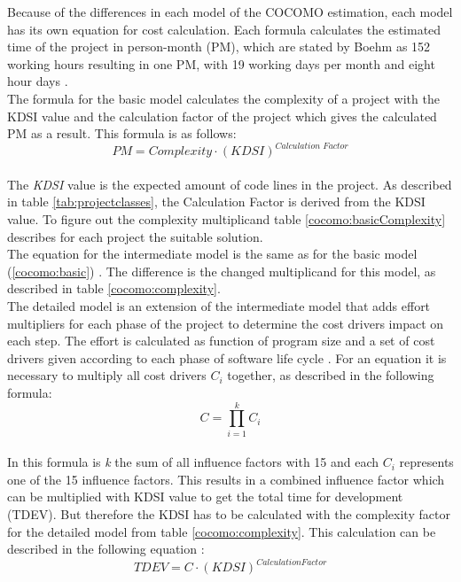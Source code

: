Because of the differences in each model of the COCOMO estimation, each model has its own equation for cost calculation. Each formula calculates the estimated time of the project in person-month (PM), which are stated by Boehm as 152 working hours resulting in one PM, with 19 working days per month and eight hour days \cite{boehm}. \\
The formula for the basic model calculates the complexity of a project with the KDSI value and the calculation factor of the project which gives the calculated PM as a result. This formula is as follows:\\
\begin{equation}
\textit{PM} = \textit{Complexity} \cdot (\textit{KDSI})^{\textit{Calculation Factor}} \label{cocomo:basic}
\end{equation}\\
The \textit{KDSI} value is the expected amount of code lines in the project. As described in table \ref{tab:projectclasses}, the Calculation Factor is derived from the KDSI value. To figure out the complexity multiplicand table \ref{cocomo:basicComplexity} describes for each project the suitable solution.\\
The equation for the intermediate model is the same as for the basic model (\ref{cocomo:basic}) \cite{boehm}. The difference is the changed multiplicand for this model, as described in table \ref{cocomo:complexity}.\\
The detailed model is an extension of the intermediate model that adds effort multipliers for each phase of the project to determine the cost drivers impact on each step. The effort is calculated as function of program size and a set of cost drivers given according to each phase of software life cycle \cite{boehm}. For an equation it is necessary to multiply all cost drivers \textbf{\(C_i\)} together, as described in the following formula:\\
\begin{equation}
C = \prod \limits_{i=1}^k C_i \label{cocomo:detailedcostdrivers}
\end{equation}\\
In this formula is \textit{k} the sum of all influence factors with 15 and each $C_i$ represents one of the 15 influence factors. This results in a combined influence factor which can be multiplied with KDSI value to get the total time for development (TDEV). But therefore the KDSI has to be calculated with the complexity factor for the detailed model from table \ref{cocomo:complexity}. This calculation can be described in the following equation \cite{boehm}:\\
\begin{equation}
TDEV = C \cdot (KDSI)^{Calculation Factor} \label{cocomo:detailed}
\end{equation}\\

